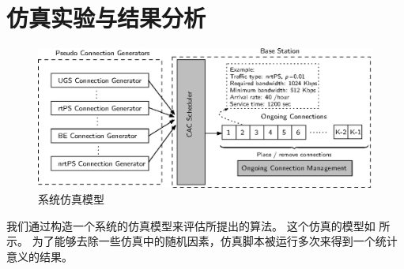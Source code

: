 \section{仿真实验与结果分析}
\begin{figure}[tb]
\centering
\includegraphics [scale=1.2] {cacop_simulator.eps}
\caption{系统仿真模型} 
\label{fig:chap_cacop:sim_cfg}
\end{figure}
我们通过构造一个系统的仿真模型来评估所提出的算法。
这个仿真的模型如 所示。
为了能够去除一些仿真中的随机因素，仿真脚本被运行多次来得到一个统计意义的结果。

